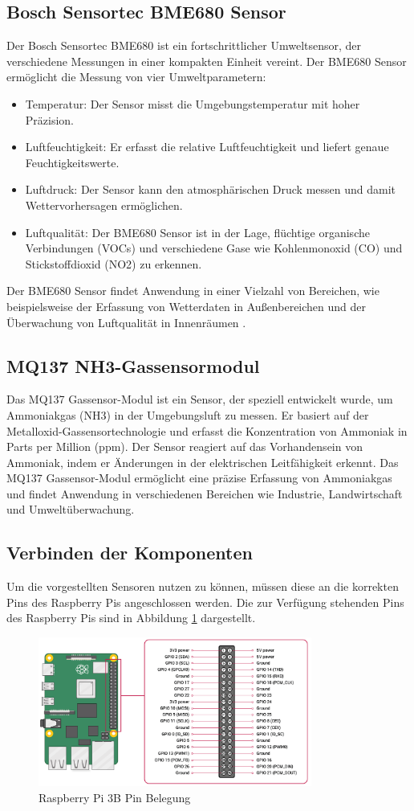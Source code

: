 \documentclass[conference]{IEEEtran}
\begin{document}
\subsection{Bosch Sensortec BME680 Sensor}
Der Bosch Sensortec BME680 ist ein fortschrittlicher Umweltsensor, der verschiedene Messungen in einer kompakten Einheit vereint. Der BME680 Sensor ermöglicht die Messung von vier Umweltparametern:
\begin{itemize}
	\item Temperatur: Der Sensor misst die Umgebungstemperatur mit hoher Präzision.
	\item Luftfeuchtigkeit: Er erfasst die relative Luftfeuchtigkeit und liefert genaue Feuchtigkeitswerte.
	\item Luftdruck: Der Sensor kann den atmosphärischen Druck messen und damit Wettervorhersagen ermöglichen.
	\item Luftqualität: Der BME680 Sensor ist in der Lage, flüchtige organische Verbindungen (VOCs) und verschiedene Gase wie Kohlenmonoxid (CO) und Stickstoffdioxid (NO2) zu erkennen.
\end{itemize}
Der BME680 Sensor findet Anwendung in einer Vielzahl von Bereichen, wie beispielsweise der Erfassung von Wetterdaten in Außenbereichen und der Überwachung von Luftqualität in Innenräumen \cite{bme}. 
\subsection{MQ137 NH3-Gassensormodul}
Das MQ137 Gassensor-Modul ist ein Sensor, der speziell entwickelt wurde, um Ammoniakgas (NH3) in der Umgebungsluft zu messen. Er basiert auf der Metalloxid-Gassensortechnologie und erfasst die Konzentration von Ammoniak in Parts per Million (ppm). Der Sensor reagiert auf das Vorhandensein von Ammoniak, indem er Änderungen in der elektrischen Leitfähigkeit erkennt. Das MQ137 Gassensor-Modul ermöglicht eine präzise Erfassung von Ammoniakgas und findet Anwendung in verschiedenen Bereichen wie Industrie, Landwirtschaft und Umweltüberwachung.

\subsection{Verbinden der Komponenten}
Um die vorgestellten Sensoren nutzen zu können, müssen diese an die korrekten Pins des Raspberry Pis angeschlossen werden. Die zur Verfügung stehenden Pins des Raspberry Pis sind in Abbildung \ref{pi_pins} dargestellt.

\begin{figure}[H]
	\centering
	\includegraphics[width=90mm]{fig/pi_pins.png}
	\caption{Raspberry Pi 3B Pin Belegung}
	\label{pi_pins}
\end{figure}
\end{document}
